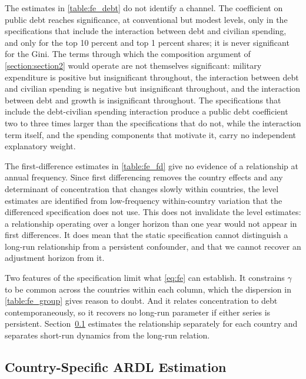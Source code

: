 \documentclass[12pt, titlepage]{article}
\numberwithin{equation}{section}
\begin{document}
The estimates in \autoref{table:fe_debt} do not identify a channel. The
coefficient on public debt reaches significance, at conventional but modest
levels, only in the specifications that include the interaction between debt
and civilian spending, and only for the top 10 percent and top 1 percent
shares; it is never significant for the Gini. The terms through which the
composition argument of \autoref{section:section2} would operate are not
themselves significant: military expenditure is positive but insignificant
throughout, the interaction between debt and civilian spending is negative but
insignificant throughout, and the interaction between debt and growth is
insignificant throughout. The specifications that include the debt-civilian
spending interaction produce a public debt coefficient two to three times
larger than the specifications that do not, while the interaction term itself,
and the spending components that motivate it, carry no independent
explanatory weight.

The first-difference estimates in \autoref{table:fe_fd} give no evidence of a
relationship at annual frequency. Since first differencing removes the country
effects and any determinant of concentration that changes slowly within
countries, the level estimates are identified from low-frequency within-country
variation that the differenced specification does not use. This does not
invalidate the level estimates: a relationship operating over a longer horizon
than one year would not appear in first differences. It does mean that the
static specification cannot distinguish a long-run relationship from a
persistent confounder, and that we cannot recover an adjustment horizon from
it.

Two features of the specification limit what \eqref{eq:fe} can establish. It
constrains $\gamma$ to be common across the countries within each column, which
the dispersion in \autoref{table:fe_group} gives reason to doubt. And it relates
concentration to debt contemporaneously, so it recovers no long-run parameter if
either series is persistent. Section~\ref{section:ardl} estimates the
relationship separately for each country and separates short-run dynamics from
the long-run relation.

\subsection{Country-Specific ARDL Estimation}
\label{section:ardl}
\end{document}
